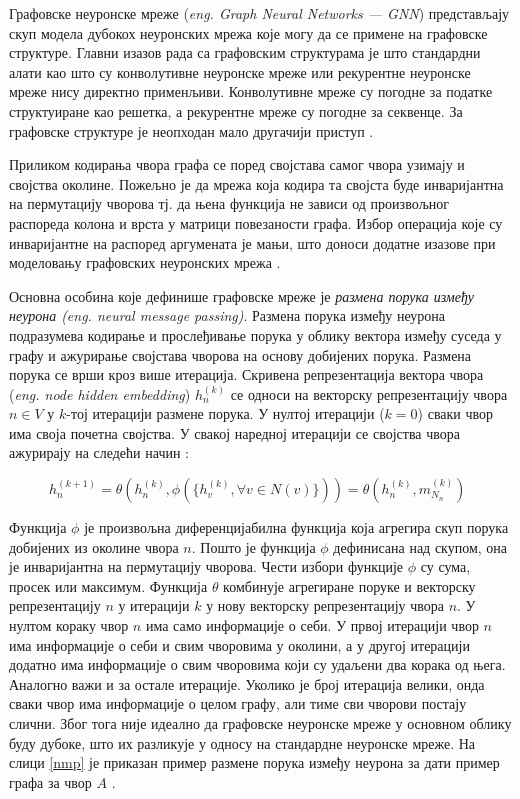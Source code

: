 \documentclass[11pt,oneside]{memoir}
\begin{document}
Графовске неуронске мреже (\textit{eng. Graph Neural Networks --- GNN}) представљају скуп модела дубокох неуронских мрежа које могу да се примене на графовске структуре.
Главни изазов рада са графовским структурама је што стандардни алати као што су конволутивне неуронске мреже или рекурентне неуронске мреже
нису директно применљиви. Конволутивне мреже су погодне за податке структуиране као решетка, а рекурентне мреже су погодне за секвенце. За 
графовске структуре је неопходан мало другачији приступ \cite{grl}. 

Приликом кодирања чвора графа се поред својстава самог чвора узимају и својства околине. Пожељно је да мрежа која кодира та својста
буде инваријантна на пермутацију чворова тј. да њена функција не зависи од произвољног распореда колона и врста у матрици повезаности графа. Избор
операција које су инваријантне на распоред аргумената је мањи, што доноси додатне изазове при моделовању графовских неуронских мрежа \cite{grl}.

Основна особина које дефинише графовске мреже је \textit{размена порука између неурона (eng. neural message passing)}. Размена порука између неурона
подразумева кодирање и прослеђивање порука у облику вектора између суседа у графу и ажурирање својстава чворова на основу добијених порука. Размена
порука се врши кроз више итерација. Скривена репрезентација вектора чвора (\textit{eng. node hidden embedding}) $h^{(k)}_n$ се односи на 
векторску репрезентацију чвора $n \in V$ у $k$-тој итерацији размене порука. У нултој итерацији ($k=0$) сваки чвор има своја почетна својства. У 
свакој наредној итерацији се својства чвора ажурирају на следећи начин \cite{grl}:

\begin{figure}[H]
  \centering
  $h^{(k+1)}_n = \theta (h^{(k)}_n, \phi (\{h^{(k)}_v, \forall v \in N(v)\})) = \theta (h^{(k)}_n, m^{(k)}_{N_{n}})$
\end{figure}

Функција $\phi$ је произвољна диференцијабилна функција која агрегира скуп порука добијених из околине чвора $n$. Пошто је функција $\phi$
дефинисана над скупом, она је инваријантна на пермутацију чворова. Чести избори функције $\phi$ су сума, просек или максимум. 
Функција $\theta$ комбинује агрегиране поруке и векторску репрезентацију $n$ у
итерацији $k$ у нову векторску репрезентацију чвора $n$. У нултом кораку чвор $n$ има само информације о себи. У првој итерацији чвор $n$ има
информације о себи и свим чворовима у околини, а у другој итерацији додатно има информације о свим чворовима који су удаљени два корака од њега. 
Аналогно важи и за остале итерације. Уколико је број итерација велики, онда сваки чвор има информације о целом графу, али тиме сви чворови постају
слични. Због тога није идеално да графовске неуронске мреже у основном облику буду дубоке, што их разликује у односу на стандардне неуронске
мреже. На слици \ref{nmp} је приказан пример размене порука између неурона за дати пример графа за чвор $A$ \cite{grl}. 
\end{document}
